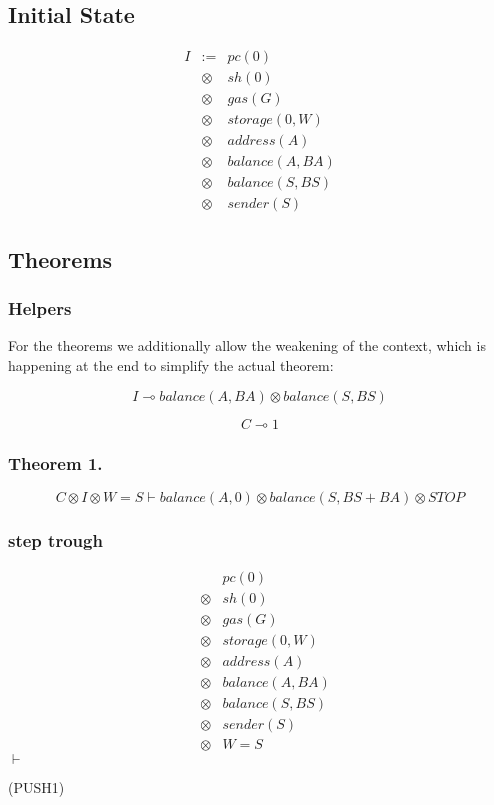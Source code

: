 \subsection*{Initial State}

\[
  \begin{array}{rcl}
    I&:=&pc(0)\\
    &\otimes&sh(0)\\
    &\otimes&gas(G)\\
    &\otimes&storage(0, W)\\
    &\otimes&address(A)\\
    &\otimes&balance(A, BA)\\
    &\otimes&balance(S, BS)\\
    &\otimes&sender(S)
  \end{array}
\]

\subsection*{Theorems}

\subsubsection*{Helpers}

For the theorems we additionally allow the weakening of the context, which is happening at the end to simplify the actual theorem:

\[
  I \multimap balance(A, BA) \otimes balance(S, BS)
\]

\[
  C \multimap 1
\]

\subsubsection*{Theorem 1.}
\[
  C \otimes I \otimes W = S \vdash balance(A, 0) \otimes balance(S, BS + BA) \otimes STOP
\]

\subsubsection*{step trough}

\[
  \begin{array}{rcl}
    &&pc(0)\\
    &\otimes&sh(0)\\
    &\otimes&gas(G)\\
    &\otimes&storage(0, W)\\
    &\otimes&address(A)\\
    &\otimes&balance(A, BA)\\
    &\otimes&balance(S, BS)\\
    &\otimes&sender(S) \\
    &\otimes& W = S
  \end{array}
\]
$\vdash$ \begin{flushright}(PUSH1)\end{flushright}

